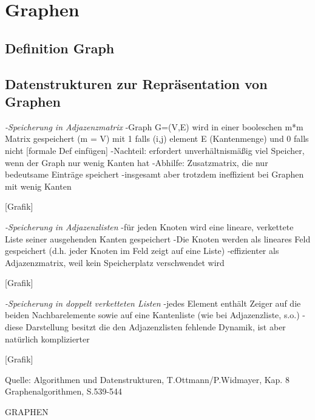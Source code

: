 \chapter{Graphen}

\section{Definition Graph}

\section{Datenstrukturen zur Repräsentation von Graphen}

\emph{-Speicherung in Adjazenzmatrix}
-Graph G=(V,E) wird in einer booleschen m*m Matrix gespeichert (m = \sharp V)
 mit 1 falls (i,j) element E (Kantenmenge) und 0 falls nicht
 [formale Def einfügen]
 -Nachteil: erfordert unverhältnismäßig viel Speicher, wenn der Graph nur wenig    	  Kanten hat
 -Abhilfe: Zusatzmatrix, die nur bedeutsame Einträge speichert
 -insgesamt aber trotzdem ineffizient bei Graphen mit wenig Kanten
 
 [Grafik]
 
\emph{-Speicherung in Adjazenzlisten}
-für jeden Knoten wird eine lineare, verkettete Liste seiner ausgehenden Kanten gespeichert
-Die Knoten werden als lineares Feld gespeichert (d.h. jeder Knoten im Feld zeigt auf eine Liste)
-effizienter als Adjazenzmatrix, weil kein Speicherplatz verschwendet wird

[Grafik]

\emph{-Speicherung in doppelt verketteten Listen}
-jedes Element enthält Zeiger auf die beiden Nachbarelemente sowie auf eine Kantenliste (wie bei Adjazenzliste, s.o.)
-diese Darstellung besitzt die den Adjazenzlisten fehlende Dynamik, ist aber natürlich komplizierter

[Grafik]

Quelle:
Algorithmen und Datenstrukturen, T.Ottmann/P.Widmayer, Kap. 8 Graphenalgorithmen, S.539-544

GRAPHEN
